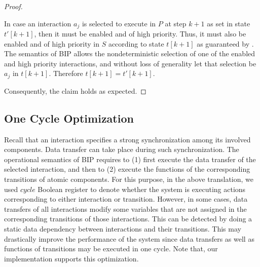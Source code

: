 \begin{proof}
\begin{itemize}
In case an interaction $a_j$ is selected to execute in $P$ at step $k+1$ as set in state $t'[k+1]$, 
then it must be enabled and of high priority.
Thus, it must also be enabled and of high priority in $S$ according to state $t[k+1]$
as guaranteed by . 
The semantics of BIP allows the nondeterministic selection of
one of the enabled and high priority interactions, and without loss of generality let that selection be $a_j$ in $t[k+1]$. 
Therefore $t[k+1]=t'[k+1]$. 
\end{itemize}
%
Consequently, the claim holds as expected. 
\end{proof}
%
\subsection{One Cycle Optimization}
%
Recall that an interaction specifies a strong synchronization among its involved components.
Data transfer can take place during such synchronization.
The operational semantics of BIP requires to (1) first execute the data transfer of the selected interaction, and then to (2) execute the functions of the corresponding transitions of atomic components.
For this purpose, in the above translation, we used $\mathit{cycle}$ Boolean register to denote whether the system is executing actions corresponding to either interaction or transition.
However, in some cases, data transfers of all interactions modify some variables that are not assigned in the corresponding transitions of those interactions.
This can be detected by doing a static data dependency between interactions and their transitions. 
This may drastically improve the performance of the system since data transfers as well as functions of transitions may be executed in one cycle. Note that, our implementation supports this optimization. 
%